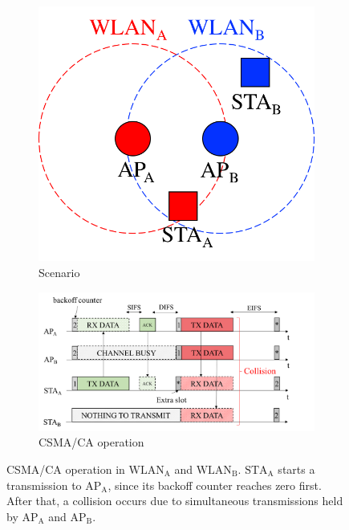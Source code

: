 \documentclass{article}
\begin{document}
\begin{figure}[h!]
	\centering		
	\begin{subfigure}[b]{0.25\textwidth}
		\includegraphics[width=\textwidth]{csma_a}
		\caption{Scenario}\label{fig:csma_a}
	\end{subfigure}
	\begin{subfigure}[b]{0.55\textwidth}
		\includegraphics[width=\textwidth]{csma_b}
		\caption{CSMA/CA operation}\label{fig:csma_b}
	\end{subfigure}
	\caption{CSMA/CA operation in $\text{WLAN}_{\text{A}}$ and $\text{WLAN}_{\text{B}}$. $\text{STA}_{\text{A}}$ starts a transmission to $\text{AP}_{\text{A}}$, since its backoff counter reaches zero first. After that, a collision occurs due to simultaneous transmissions held by $\text{AP}_{\text{A}}$ and $\text{AP}_{\text{B}}$.}
	\label{fig:csma}
\end{figure}
\end{document}

